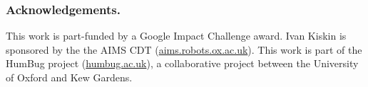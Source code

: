 \documentclass[10pt, twocolumn]{llncs}
\begin{document}



\subsubsection{Acknowledgements.}
This work is part-funded by a Google Impact Challenge award. Ivan Kiskin is sponsored by the the AIMS CDT (\url{aims.robots.ox.ac.uk}). This work is part of the HumBug project (\url{humbug.ac.uk}), a collaborative project between the University of Oxford and Kew Gardens.

%
%



%







% 
\end{document}

